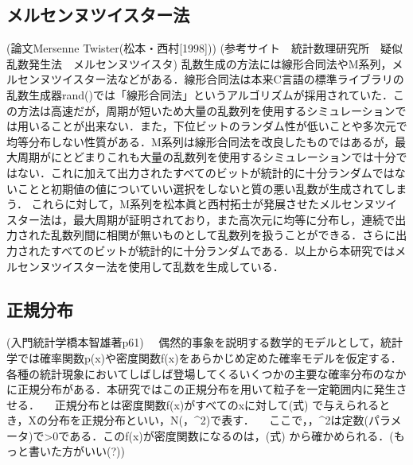\documentclass[11pt]{jreport}
\begin{document}
\subsection{メルセンヌツイスター法}
(論文Mersenne Twister(松本・西村[1998]))
(参考サイト　統計数理研究所　疑似乱数発生法　メルセンヌツイスタ)
乱数生成の方法には線形合同法やM系列，メルセンヌツイスター法などがある．線形合同法は本来C言語の標準ライブラリの乱数生成器rand()では「線形合同法」というアルゴリズムが採用されていた．この方法は高速だが，周期が短いため大量の乱数列を使用するシミュレーションでは用いることが出来ない．また，下位ビットのランダム性が低いことや多次元で均等分布しない性質がある．M系列は線形合同法を改良したものではあるが，最大周期がにとどまりこれも大量の乱数列を使用するシミュレーションでは十分ではない．これに加えて出力されたすべてのビットが統計的に十分ランダムではないことと初期値の値についていい選択をしないと質の悪い乱数が生成されてしまう．
これらに対して，M系列を松本眞と西村拓士が発展させたメルセンヌツイスター法は，最大周期が証明されており，また高次元に均等に分布し，連続で出力された乱数列間に相関が無いものとして乱数列を扱うことができる．さらに出力されたすべてのビットが統計的に十分ランダムである．以上から本研究ではメルセンヌツイスター法を使用して乱数を生成している．

\subsection{正規分布}
(入門統計学橋本智雄著p61)
　偶然的事象を説明する数学的モデルとして，統計学では確率関数p(x)や密度関数f(x)をあらかじめ定めた確率モデルを仮定する．各種の統計現象においてしばしば登場してくるいくつかの主要な確率分布のなかに正規分布がある．本研究ではこの正規分布を用いて粒子を一定範囲内に発生させる．
　正規分布とは密度関数f(x)がすべてのxに対して(式)
で与えられるとき，Xの分布を正規分布といい，N(\mu，\sigma^{2})で表す．
　ここで，\mu，\sigma^{2}は定数(パラメータ)で\sigma>0である．このf(x)が密度関数になるのは，(式)
から確かめられる．(もっと書いた方がいい(?))
\end{document}
